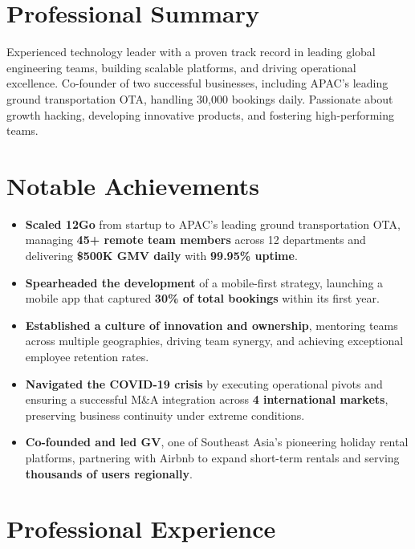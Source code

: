 \documentclass[11pt,a4paper]{article}
\begin{document}
\section*{Professional Summary}
{
Experienced technology leader with a proven track record in leading global engineering teams, building scalable platforms, and driving operational excellence. Co-founder of two successful businesses, including APAC's leading ground transportation OTA, handling 30,000 bookings daily. Passionate about growth hacking, developing innovative products, and fostering high-performing teams.}

\section*{Notable Achievements}
\begin{itemize}
    \item \textbf{Scaled 12Go} from startup to APAC's leading ground transportation OTA, managing \textbf{45+ remote team members} across 12 departments and delivering \textbf{\$500K GMV daily} with \textbf{99.95\% uptime}.
    \item \textbf{Spearheaded the development} of a mobile-first strategy, launching a mobile app that captured \textbf{30\% of total bookings} within its first year.
    \item \textbf{Established a culture of innovation and ownership}, mentoring teams across multiple geographies, driving team synergy, and achieving exceptional employee retention rates.
    \item \textbf{Navigated the COVID-19 crisis} by executing operational pivots and ensuring a successful M\&A integration across \textbf{4 international markets}, preserving business continuity under extreme conditions.
    \item \textbf{Co-founded and led GV}, one of Southeast Asia's pioneering holiday rental platforms, partnering with Airbnb to expand short-term rentals and serving \textbf{thousands of users regionally}.
\end{itemize}

\section*{Professional Experience}
\end{document}
